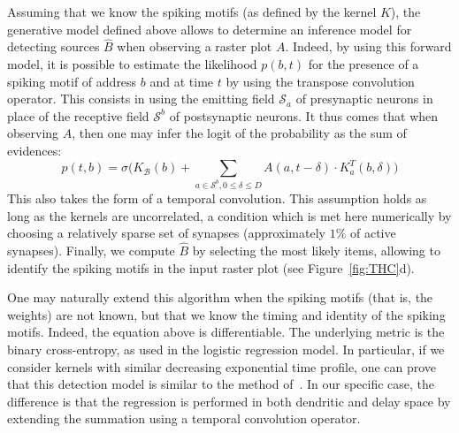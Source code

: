 \documentclass[runningheads]{llncs}
\newcommand{\presynaddr}{a} %
\newcommand{\postsynaddr}{b} %
\newcommand{\postsynaddrspace}{\mathcal{B}} %
\newcommand{\synapse}{\mathcal{S}} %
\newcommand{\synapticdelay}{\delta} %
\newcommand{\kernel}{K} %
\begin{document}
% 
Assuming that we know the spiking motifs (as defined by the kernel $\kernel$), the generative model defined above allows to determine an inference model for detecting sources $\hat{B}$ when observing a raster plot $A$. Indeed, by using this forward model, it is possible to estimate the likelihood $p(b, t)$ for the presence of a spiking motif of address $b$ and at time $t$ by using the transpose convolution operator. This consists in using the emitting field $\synapse_\presynaddr$ of presynaptic neurons in place of the receptive field $\synapse^\postsynaddr$ of postsynaptic neurons. It thus comes that when observing $A$, then one may infer the logit of the probability as the sum of evidences:
\begin{equation*}
  p(t, \postsynaddr) = \sigma\big(\kernel_\postsynaddrspace(b) + \sum_{\presynaddr \in \synapse^\postsynaddr,  0 \le \synapticdelay \le D} A(\presynaddr, t-\synapticdelay) \cdot \kernel^T_\presynaddr(\postsynaddr, \synapticdelay) \big)  
\end{equation*}
This also takes the form of a temporal convolution. This assumption holds as long as the kernels are uncorrelated, a condition which is met here numerically by choosing a relatively sparse set of synapses (approximately $1\%$ of active synapses). Finally, we compute $\hat{B}$ by selecting the most likely items, allowing to identify the spiking motifs in the input raster plot (see Figure~\ref{fig:THC}d). 

One may naturally extend this algorithm when the spiking motifs (that is, the weights) are not known, but that we know the timing and identity of the spiking motifs. Indeed, the equation above is differentiable. 
The underlying metric is the binary cross-entropy, as used in the logistic regression model. In particular, if we consider kernels with similar decreasing exponential time profile, one can prove that this detection model is similar to the method of~\cite{berens_fast_2012}. In our specific case, the difference is that the regression is performed in both dendritic and delay space by extending the summation using a temporal convolution operator. 
\end{document}
